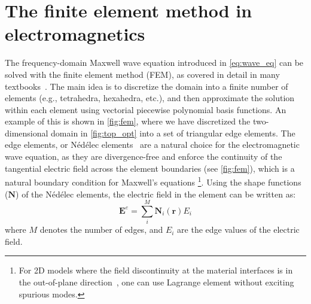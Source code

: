 

    \section{The finite element method in electromagnetics}\label{sec:fem}
    The frequency-domain Maxwell wave equation introduced in \eqref{eq:wave_eq} can be solved with the finite element method (FEM), as covered in detail 
    in many textbooks~\cite{jin, fem_book}. The main idea is to discretize the domain into a finite number of elements (e.g., tetrahedra, hexahedra, etc.), and then approximate the solution
    within each element using vectorial piecewise polynomial basis functions.
    An example of this is shown in \autoref{fig:fem},
    where we have discretized the two-dimensional
    domain in \autoref{fig:top_opt} into a set of triangular edge elements. The
    edge elements, or Nédélec elements~\cite{nedelec}
    are a natural choice for the electromagnetic
    wave equation, as they are divergence-free and enforce the continuity of the
    tangential electric field
    across the element boundaries (see \autoref{fig:fem}), which is a natural boundary condition for
    Maxwell's equations
    \footnote{For 2D models where the field discontinuity at the material
        interfaces
        is in the out-of-plane direction~\cite{ownpub3}, one can use Lagrange element
        without
        exciting spurious modes.}. Using the shape functions ($\boldsymbol{N}$) of the Nédélec elements,
    the electric field in the element can be written as:
    \begin{equation}
        \boldsymbol{E}^e=\sum^M_i \boldsymbol{N}_i(\mathbf{r}) E_i
    \end{equation}
    where $M$ denotes the number of edges, and $E_i$ are the edge values of the electric field.

